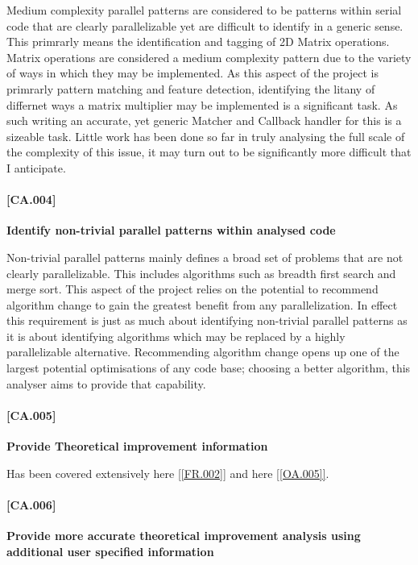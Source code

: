 Medium complexity parallel patterns are considered to be patterns within serial code that are clearly parallelizable yet are difficult to identify in a generic sense. This primrarly means the identification and tagging of 2D Matrix operations. Matrix operations are considered a medium complexity pattern due to the variety of ways in which they may be implemented. As this aspect of the project is primrarly pattern matching and feature detection, identifying the litany of differnet ways a matrix multiplier may be implemented is a significant task. As such writing an accurate, yet generic Matcher and Callback handler for this is a sizeable task. Little work has been done so far in truly analysing the full scale of the complexity of this issue, it may turn out to be significantly more difficult that I anticipate.

\paragraph{[CA.004]}
\textbf{Identify non-trivial parallel patterns within analysed code}

Non-trivial parallel patterns mainly defines a broad set of problems that are not clearly parallelizable. This includes algorithms such as breadth first search and merge sort. This aspect of the project relies on the potential to recommend algorithm change to gain the greatest benefit from any parallelization. In effect this requirement is just as much about identifying non-trivial parallel patterns as it is about identifying algorithms which may be replaced by a highly parallelizable alternative. Recommending algorithm change opens up one of the largest potential optimisations of any code base; choosing a better algorithm, this analyser aims to provide that capability.

\paragraph{[CA.005]} \label{[CA.006]}
\textbf{Provide Theoretical improvement information}

Has been covered extensively here \ref{[FR.002]} and here \ref{[OA.005]}.

\paragraph{[CA.006]}
\textbf{Provide more accurate theoretical improvement analysis using additional user specified information}


